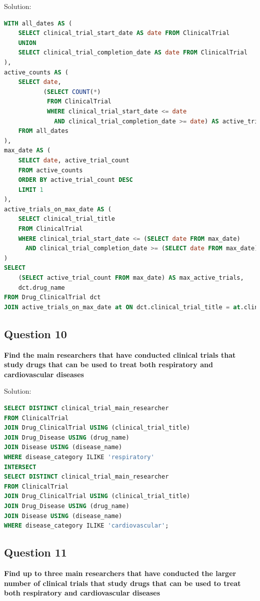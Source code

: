 \documentclass[12pt,a4paper]{article}
\begin{document}
Solution:
\begin{lstlisting}[language=SQL]
WITH all_dates AS (
    SELECT clinical_trial_start_date AS date FROM ClinicalTrial
    UNION
    SELECT clinical_trial_completion_date AS date FROM ClinicalTrial
),
active_counts AS (
    SELECT date,
           (SELECT COUNT(*)
            FROM ClinicalTrial
            WHERE clinical_trial_start_date <= date
              AND clinical_trial_completion_date >= date) AS active_trial_count
    FROM all_dates
),
max_date AS (
    SELECT date, active_trial_count
    FROM active_counts
    ORDER BY active_trial_count DESC
    LIMIT 1
),
active_trials_on_max_date AS (
    SELECT clinical_trial_title
    FROM ClinicalTrial
    WHERE clinical_trial_start_date <= (SELECT date FROM max_date)
      AND clinical_trial_completion_date >= (SELECT date FROM max_date)
)
SELECT 
    (SELECT active_trial_count FROM max_date) AS max_active_trials,
    dct.drug_name
FROM Drug_ClinicalTrial dct
JOIN active_trials_on_max_date at ON dct.clinical_trial_title = at.clinical_trial_title;
\end{lstlisting}

\subsection{Question 10}
\textbf{Find the main researchers that have conducted clinical trials that study drugs that can be used to treat both respiratory and cardiovascular diseases}

Solution:
\begin{lstlisting}[language=SQL]
SELECT DISTINCT clinical_trial_main_researcher
FROM ClinicalTrial
JOIN Drug_ClinicalTrial USING (clinical_trial_title)
JOIN Drug_Disease USING (drug_name)
JOIN Disease USING (disease_name)
WHERE disease_category ILIKE 'respiratory'
INTERSECT
SELECT DISTINCT clinical_trial_main_researcher
FROM ClinicalTrial
JOIN Drug_ClinicalTrial USING (clinical_trial_title)
JOIN Drug_Disease USING (drug_name)
JOIN Disease USING (disease_name)
WHERE disease_category ILIKE 'cardiovascular';
\end{lstlisting}

\subsection{Question 11}
\textbf{Find up to three main researchers that have conducted the larger number of clinical trials that study drugs that can be used to treat both respiratory and cardiovascular diseases}
\end{document}
